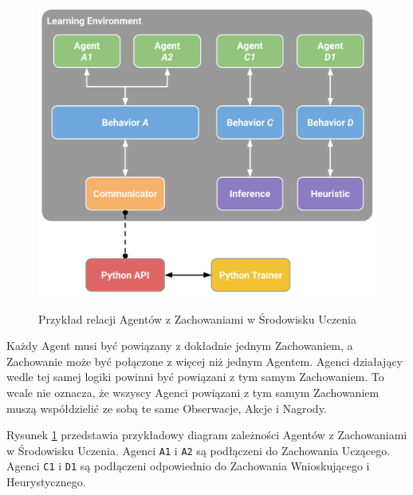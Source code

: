 \begin{figure}[h]
\begin{center}
\includegraphics[width=15cm]{resources/figures/learning_environment_example.png}
\caption{Przykład relacji Agentów z Zachowaniami w Środowisku Uczenia}
\label{UnityMlaExample}
\end{center}
\end{figure}

Każdy Agent musi być powiązany z dokładnie jednym Zachowaniem, a Zachowanie może być połączone z więcej niż jednym Agentem. Agenci działający wedle tej samej logiki powinni być powiązani z tym samym Zachowaniem. To wcale nie oznacza, że wszyscy Agenci powiązani z tym samym Zachowaniem muszą współdzielić ze sobą te same Obserwacje, Akcje i Nagrody.

Rysunek \ref{UnityMlaExample} przedstawia przykładowy diagram zależności Agentów z Zachowaniami w Środowisku Uczenia. Agenci \texttt{A1} i \texttt{A2} są podłączeni do Zachowania Uczącego. Agenci \texttt{C1} i \texttt{D1} są podłączeni odpowiednio do Zachowania Wnioskującego i Heurystycznego.

